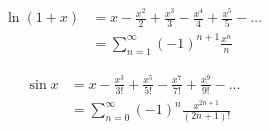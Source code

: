 \[\begin{align} \ln (1 + x) &= x - \frac{x^2}{2} + \frac{x^3}{3} - \frac{x^4}{4} + \frac{x^5}{5} - \dotso \\\ &= \sum_{n=1}^\infty (-1)^{n + 1} \frac{x^n}{n} \end{align}\]

\[\begin{align} \sin x &= x - \frac{x^3}{3!} + \frac{x^5}{5!} - \frac{x^7}{7!} + \frac{x^9}{9!} - \dotso \\\ &= \sum_{n=0}^\infty (-1)^n \frac{x^{2n + 1}}{(2n + 1)!} \end{align}\]
